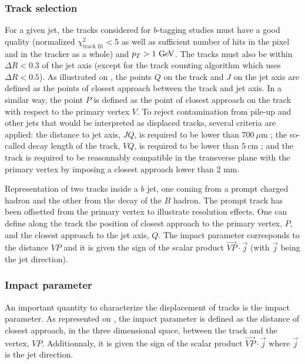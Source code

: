     \subsubsection{Track selection}
    
    For a given jet, the tracks considered for $b$-tagging studies must have
    a good quality (normalized $\chi^2_\text{track fit} < 5$ as well as sufficient number of hits in the
    pixel and in the tracker as a whole) and $p_T > 1~\text{GeV}$. The tracks must also be within
    $\Delta R < 0.3$ of the jet axis (except for the track counting algorithm which uses $\Delta R < 0.5$).
    As illustrated on , the points $Q$ on the track
    and $J$ on the jet axis are defined as the points of closest approach between the
    track and jet axis. In a similar way, the point $P$ is defined as the point of closest
    approach on the track with respect to the primary vertex $V$. To reject contamination
    from pile-up and other jets that would be interpreted as displaced tracks, several
    criteria are applied: the distance to jet axis, $JQ$, is required to be lower than
    $700~{\mu\text{m}}$ ; the so-called decay length of the track, $VQ$, is required to
    be lower than $5~\text{cm}$ ; and the track is required to be reasonnably compatible
    in the transverse plane with the primary vertex by imposing a closest approach lower
    than 2 mm.

                 {Representation of two tracks inside a $b$ jet, one coming from a prompt 
                 charged hadron and the other from the decay of
                 the $B$ hadron. The prompt track has been offsetted from the primary vertex
                 to illustrate resolution effects. One can define along the track the position
                 of closest approach to the primary vertex, $P$, and the closest approach
                 to the jet axis, $Q$. The impact parameter corresponds to the distance $VP$
                 and it is given the sign of the scalar product $\vec{VP} \cdot \vec{j}$ (with
                 $\vec{j}$ being the jet direction).}

    \subsubsection{Impact parameter}

    An important quantity to characterize the displacement of tracks is the impact parameter.
    As represented on , the impact parameter is defined
    as the distance of closest approach, in the three dimensional space, between the track
    and the vertex, $VP$. Additionnaly, it is given the sign of the scalar product $\vec{VP}
    \cdot \vec{j}$ where $\vec{j}$ is the jet direction.

